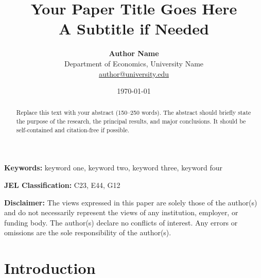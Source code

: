 \documentclass[12pt, a4paper]{article}
\title{%
    \vspace{2cm}
    {\LARGE \textbf{Your Paper Title Goes Here}} \\[1.5em]
    {\large A Subtitle if Needed}
}
\author{%
    \textbf{Author Name} \\[0.4em]
    \small Department of Economics, University Name \\
    \small \href{mailto:author@university.edu}{author@university.edu}
}
\date{\small \today}
\theoremstyle{definition}
\theoremstyle{remark}
\begin{document}
\begin{titlepage}
    \maketitle
    \thispagestyle{empty}

    \vspace{2em}

    \begin{abstract}
        \noindent
        Replace this text with your abstract (150–250 words). The abstract should
        briefly state the purpose of the research, the principal results, and major
        conclusions. It should be self-contained and citation-free if possible.
    \end{abstract}

    \vspace{1em}

    \noindent\textbf{Keywords:} keyword one, keyword two, keyword three, keyword four

    \vspace{0.8em}

    \noindent\textbf{JEL Classification:} C23, E44, G12   %

    \vspace{2em}

    \begin{small}
        \noindent\textbf{Disclaimer:} The views expressed in this paper are solely those
        of the author(s) and do not necessarily represent the views of any institution,
        employer, or funding body. The author(s) declare no conflicts of interest. Any
        errors or omissions are the sole responsibility of the author(s).
    \end{small}

\end{titlepage}

\setcounter{page}{1}

\section{Introduction}
\label{sec:introduction}
\end{document}
